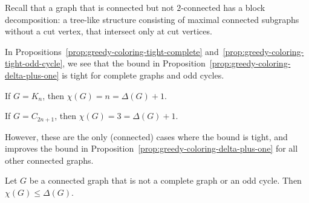 Recall that a graph that is connected but not \(2\)-connected has a block decomposition: a tree-like structure consisting of maximal connected subgraphs without a cut vertex, that intersect only at cut vertices.

In Propositions~\ref{prop:greedy-coloring-tight-complete} and~\ref{prop:greedy-coloring-tight-odd-cycle},
we see that the bound in Proposition~\ref{prop:greedy-coloring-delta-plus-one} is tight for complete graphs and odd cycles.

\begin{proposition} \label{prop:greedy-coloring-tight-complete}
    If \(G = K_n\), then \(\chi(G) = n = \Delta(G) + 1\).
\end{proposition}

\begin{proposition} \label{prop:greedy-coloring-tight-odd-cycle}
    If \(G = C_{2n + 1}\), then \(\chi(G) = 3 = \Delta(G) + 1\).
\end{proposition}

However, these are the only (connected) cases where the bound is tight, and  \cite{Brooks1941} improves the bound in Proposition~\ref{prop:greedy-coloring-delta-plus-one} for all other connected graphs.

\begin{theorem} \label{thm:brooks-theorem}
    Let \(G\) be a connected graph that is not a complete graph or an odd cycle.
    Then \(\chi(G) \leq \Delta(G)\).
\end{theorem}

